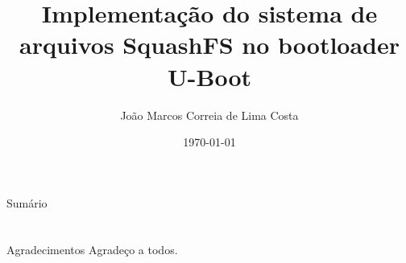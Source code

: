 \documentclass[handout]{beamer}
\title[Trabalho de conclusão de curso]{
	Implementação do sistema de arquivos SquashFS no bootloader U-Boot}
\date{
	\today}
\author[João Marcos Correia de Lima Costa]{
	João Marcos Correia de Lima Costa %
	}
\institute[INSTITUTO]{
	\vspace{0.25cm}
	Departamento de Engenharia Elétrica\\
	Universidade Federal do Rio Grande do Norte}
\begin{document}
\frame{\titlepage}
\begin{frame}{Sumário}
	\tableofcontents
\end{frame}











\section{}
\begin{frame}{Agradecimentos}
	Agradeço a todos. 	
\end{frame}
\end{document}
